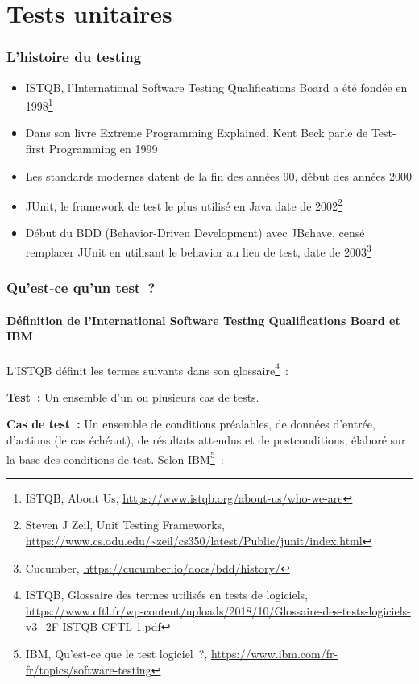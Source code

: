 \documentclass{beamer}
\begin{document}
    \section{Tests unitaires}\label{sec:tests-unitaires}

    \begin{frame}
        \transdissolve
        \frametitle{L'histoire du testing}

        \begin{itemize}

            \item ISTQB, l'International Software Testing Qualifications Board a été fondée en 1998\footnote{ISTQB, About Us, \url{https://www.istqb.org/about-us/who-we-are}}
            \item Dans son livre Extreme Programming Explained, Kent Beck parle de Test-first Programming en 1999
            \item Les standards modernes datent de la fin des années 90, début des années 2000
            \item JUnit, le framework de test le plus utilisé en Java date de 2002\footnote{Steven J Zeil, Unit Testing Frameworks, \url{https://www.cs.odu.edu/~zeil/cs350/latest/Public/junit/index.html}}
            \item Début du BDD (Behavior-Driven Development) avec JBehave, censé remplacer JUnit en utilisant le behavior au lieu de test, date de 2003\footnote{Cucumber, \url{https://cucumber.io/docs/bdd/history/}}
        \end{itemize}

    \end{frame}

    \begin{frame}
        \frametitle{Qu’est-ce qu’un test~?}
        \framesubtitle{Définition de l'International Software Testing Qualifications Board et IBM}
        \transdissolve
        L’ISTQB définit les termes suivants dans son glossaire\footnote{ISTQB, Glossaire des termes utilisés en tests de logiciels, \url{https://www.cftl.fr/wp-content/uploads/2018/10/Glossaire-des-tests-logiciels-v3_2F-ISTQB-CFTL-1.pdf}}~:

        \textbf{Test~:} Un ensemble d’un ou plusieurs cas
        de tests.

        \textbf{Cas de test~:} Un ensemble de conditions
        préalables, de données d'entrée, d'actions
        (le cas échéant), de résultats attendus et
        de postconditions, élaboré sur la base des
        conditions de test.
        \bigbreak
        Selon IBM\footnote{IBM, Qu'est-ce que le test logiciel~?, \url{https://www.ibm.com/fr-fr/topics/software-testing}}~:

    \end{frame}
\end{document}
